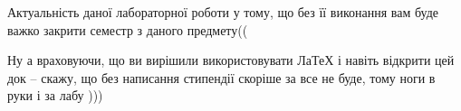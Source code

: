 Актуальність даної лабораторної роботи
у тому, що без її виконання вам буде важко закрити семестр з даного предмету((

Ну а враховуючи, що ви вирішили використовувати ЛаТеХ і навіть відкрити цей док -- скажу, що без написання стипендії скоріше за все не буде,
тому ноги в руки і за лабу )))
